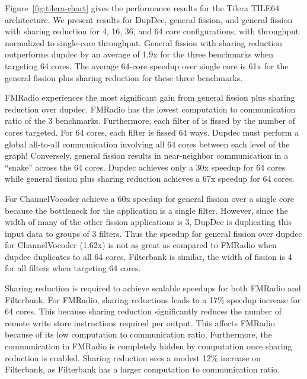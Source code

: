 Figure~\ref{fig:tilera-chart} gives the performance results for the
Tilera TILE64 architecture.  We present results for DupDec, general
fission, and general fission with sharing reduction for 4, 16, 36, and
64 core configurations, with throughput normalized to single-core
throughput.  General fission with sharing reduction outperforms
dupdec by an average of 1.9x for the three benchmarks when targeting
64 cores. The average 64-core speedup over single core is 61x for the
general fission plus sharing reduction for these three benchmarks.

FMRadio experiences the most significant gain from general fission
plus sharing reduction over dupdec.  FMRadio has the lowest
computation to communication ratio of the 3 benchmarks.  Furthermore,
each filter of is fissed by the number of cores targeted.  For 64
cores, each filter is fissed 64 ways.  Dupdec must perform a global
all-to-all communication involving all 64 cores between each level of
the graph!  Conversely, general fission results in near-neighbor
communication in a ``snake'' across the 64 cores.  Dupdec achieves
only a 30x speedup for 64 cores while general fission plus sharing
reduction achieves a 67x speedup for 64 cores.

For ChannelVocoder achieve a 60x speedup for general fission over a
single core because the bottleneck for the application is a single
filter.  However, since the width of many of the other fission
applications is 3, DupDec is duplicating this input data to groups of
3 filters.  Thus the speedup for general fission over dupdec for
ChannelVocoder (1.62x) is not as great as compared to FMRadio when
dupdec duplicates to all 64 cores.  Filterbank is similar, the width
of fission is 4 for all filters when targeting 64 cores.

Sharing reduction is required to achieve scalable speedups for both
FMRadio and Filterbank.  For FMRadio, sharing reductions leads to a
17\% speedup increase for 64 cores.  This because sharing reduction
significantly reduces the number of remote write store instructions
required per output.  This affects FMRadio because of its low
computation to communication ratio.  Furthermore, the communication in
FMRadio is completely hidden by computation once sharing reduction is
enabled.  Sharing reduction sees a modest 12\% increase on Filterbank,
as Filterbank has a larger computation to communication ratio.


